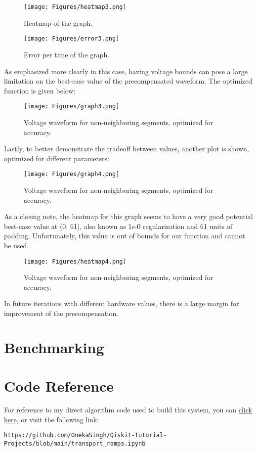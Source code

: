 \begin{figure}[!h]
  \centering
  \begin{minipage}[b]{0.5\textwidth}
    \texttt{[image: Figures/heatmap3.png]}
    \caption{Heatmap of the graph.}
  \end{minipage}
  \hfill
  \begin{minipage}[b]{0.5\textwidth}
    \texttt{[image: Figures/error3.png]}
    \caption{Error per time of the graph.}
  \end{minipage}
\end{figure}

As emphasized more clearly in this case, having voltage bounds can pose a large limitation on the best-case value of the precompensated waveform. The optimized function is given below:

\begin{figure}[h!]
    \centering
\texttt{[image: Figures/graph3.png]}
    \caption{Voltage waveform for non-neighboring segments, optimized for accuracy.}
\end{figure} \label{graph3}

Lastly, to better demonstrate the tradeoff between values, another plot is shown, optimized for different parameters:

\begin{figure}[h!]
    \centering
\texttt{[image: Figures/graph4.png]}
    \caption{Voltage waveform for non-neighboring segments, optimized for accuracy.}
\end{figure} \label{graph4}

As a closing note, the heatmap for this graph seems to have a very good potential best-case value at (0, 61), also known as 1e-0 regularization and 61 units of padding. Unfortunately, this value is out of bounds for our function and cannot be used.

\begin{figure}[h!]
    \centering
\texttt{[image: Figures/heatmap4.png]}
    \caption{Voltage waveform for non-neighboring segments, optimized for accuracy.}
\end{figure} \label{heatmap4}

In future iterations with different hardware values, there is a large margin for improvement of the precompensation.
\section{Benchmarking}
\section{Code Reference}
For reference to my direct algorithm code used to build this system, you can \href{https://github.com/OnekaSingh/Qiskit-Tutorial-Projects/blob/main/transport_ramps.ipynb}{click here}, or visit the following link:
\begin{verbatim}
https://github.com/OnekaSingh/Qiskit-Tutorial-Projects/blob/main/transport_ramps.ipynb
\end{verbatim}

